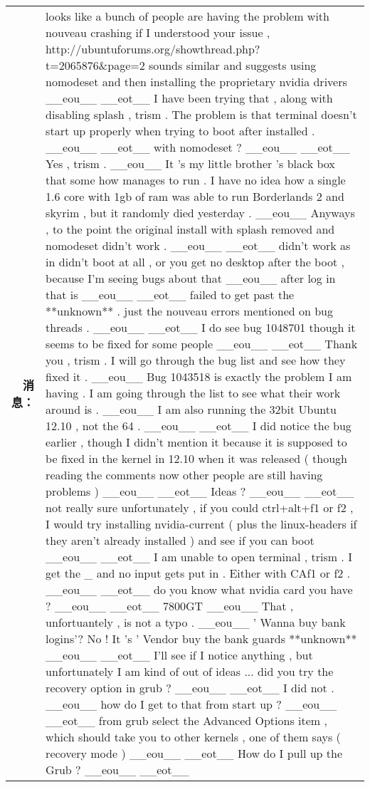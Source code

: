 \begin{tabularx}{\textwidth}{@{}rX@{}}
\textbf{消息：}&looks like a bunch of people are having the problem with nouveau crashing if I understood your issue , http://ubuntuforums.org/showthread.php?t=2065876\&page=2 sounds similar and suggests using nomodeset and then installing the proprietary nvidia drivers \_\_eou\_\_ \_\_eot\_\_ I have been trying that , along with disabling splash , trism . The problem is that terminal doesn't start up properly when trying to boot after installed . \_\_eou\_\_ \_\_eot\_\_ with nomodeset ? \_\_eou\_\_ \_\_eot\_\_ Yes , trism . \_\_eou\_\_ It 's my little brother 's black box that some how manages to run . I have no idea how a single 1.6 core with 1gb of ram was able to run Borderlands 2 and skyrim , but it randomly died yesterday . \_\_eou\_\_ Anyways , to the point the original install with splash removed and nomodeset didn't work . \_\_eou\_\_ \_\_eot\_\_ didn't work as in didn't boot at all , or you get no desktop after the boot , because I'm seeing bugs about that \_\_eou\_\_ after log in that is \_\_eou\_\_ \_\_eot\_\_ failed to get past the **unknown** . just the nouveau errors mentioned on bug threads . \_\_eou\_\_ \_\_eot\_\_ I do see bug 1048701 though it seems to be fixed for some people \_\_eou\_\_ \_\_eot\_\_ Thank you , trism . I will go through the bug list and see how they fixed it . \_\_eou\_\_ Bug 1043518 is exactly the problem I am having . I am going through the list to see what their work around is . \_\_eou\_\_ I am also running the 32bit Ubuntu 12.10 , not the 64 . \_\_eou\_\_ \_\_eot\_\_ I did notice the bug earlier , though I didn't mention it because it is supposed to be fixed in the kernel in 12.10 when it was released ( though reading the comments now other people are still having problems ) \_\_eou\_\_ \_\_eot\_\_ Ideas ? \_\_eou\_\_ \_\_eot\_\_ not really sure unfortunately , if you could ctrl+alt+f1 or f2 , I would try installing nvidia{-}current ( plus the linux{-}headers if they aren't already installed ) and see if you can boot \_\_eou\_\_ \_\_eot\_\_ I am unable to open terminal , trism . I get the \_ and no input gets put in . Either with CAf1 or f2 . \_\_eou\_\_ \_\_eot\_\_ do you know what nvidia card you have ? \_\_eou\_\_ \_\_eot\_\_ 7800GT \_\_eou\_\_ That , unfortuantely , is not a typo . \_\_eou\_\_ ' Wanna buy bank logins'? No ! It 's ' Vendor buy the bank guards **unknown** \_\_eou\_\_ \_\_eot\_\_ I'll see if I notice anything , but unfortunately I am kind of out of ideas ... did you try the recovery option in grub ? \_\_eou\_\_ \_\_eot\_\_ I did not . \_\_eou\_\_ how do I get to that from start up ? \_\_eou\_\_ \_\_eot\_\_ from grub select the Advanced Options item , which should take you to other kernels , one of them says ( recovery mode ) \_\_eou\_\_ \_\_eot\_\_ How do I pull up the Grub ? \_\_eou\_\_ \_\_eot\_\_\\%

\end{tabularx}
